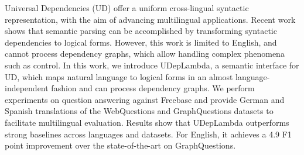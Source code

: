 Universal Dependencies (UD) offer a uniform cross-lingual syntactic representation, with the aim of advancing multilingual applications. Recent work shows that semantic parsing can be accomplished by transforming syntactic dependencies to logical forms. However, this work is limited to English, and cannot process dependency graphs, which allow handling complex phenomena such as control. In this work, we introduce UDepLambda, a semantic interface for UD, which maps natural language to logical forms in an almost language-independent fashion and can process dependency graphs. We perform experiments on question answering against Freebase and provide German and Spanish translations of the WebQuestions and GraphQuestions datasets to facilitate multilingual evaluation. Results show that UDepLambda outperforms strong baselines across languages and datasets.  For English, it achieves a 4.9 F1 point improvement over the state-of-the-art on GraphQuestions.
